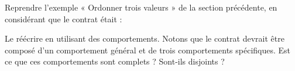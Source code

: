 

Reprendre l'exemple « Ordonner trois valeurs » de la section
précédente, en considérant que le contrat était :




Le réécrire en utilisant des comportements. Notons que le contrat
devrait être composé d'un comportement général et de trois
comportements spécifiques. Est ce que ces comportements sont complets ?
Sont-ils disjoints ?
